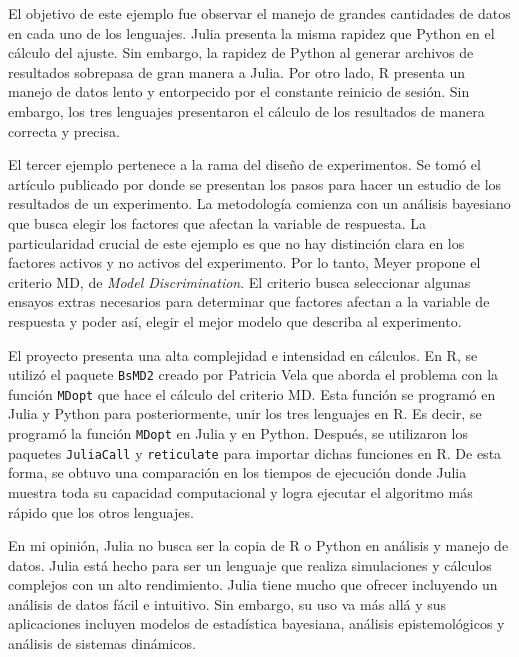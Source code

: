El objetivo de este ejemplo fue observar el manejo de grandes cantidades de datos en cada uno de los lenguajes. \textsf{Julia} presenta la misma rapidez que \textsf{Python} en el cálculo del ajuste. Sin embargo, la rapidez de \textsf{Python} al generar archivos de resultados sobrepasa de gran manera a \textsf{Julia}. Por otro lado, \textsf{R} presenta un manejo de datos lento y entorpecido por el constante reinicio de sesión. Sin embargo, los tres lenguajes presentaron el cálculo de los resultados de manera correcta y precisa. 

El tercer ejemplo pertenece a la rama del diseño de experimentos. Se tomó el artículo publicado por \cite{meyer1996} donde se presentan los pasos para hacer un estudio de los resultados de un experimento. La metodología comienza con un análisis bayesiano que busca elegir los factores que afectan la variable de respuesta. La particularidad crucial de este ejemplo es que no hay distinción clara en los factores activos y no activos del experimento. Por lo tanto, Meyer propone el criterio MD, de \textit{Model Discrimination}. El criterio busca seleccionar algunas ensayos extras necesarios para determinar que factores afectan a la variable de respuesta y poder así, elegir el mejor modelo que describa al experimento. 

El proyecto presenta una alta complejidad e intensidad en cálculos. En \textsf{R}, se utilizó el paquete \texttt{BsMD2} creado por Patricia Vela que aborda el problema con la función \texttt{MDopt} que hace el cálculo del criterio MD. Esta función se programó en \textsf{Julia} y \textsf{Python} para posteriormente, unir los tres lenguajes en \textsf{R}. Es decir, se programó la función \texttt{MDopt} en \textsf{Julia} y en \textsf{Python}. Después, se utilizaron los paquetes \texttt{JuliaCall} y \texttt{reticulate} para importar dichas funciones en \textsf{R}. De esta forma, se obtuvo una comparación en los tiempos de ejecución donde \textsf{Julia} muestra toda su capacidad computacional y logra ejecutar el algoritmo más rápido que los otros lenguajes. 

En mi opinión, \textsf{Julia} no busca ser la copia de \textsf{R} o \textsf{Python} en análisis y manejo de datos. \textsf{Julia} está hecho para ser un lenguaje que realiza simulaciones y cálculos complejos con un alto rendimiento. \textsf{Julia} tiene mucho que ofrecer incluyendo un análisis de datos fácil e intuitivo. Sin embargo, su uso va más allá y sus aplicaciones incluyen modelos de estadística bayesiana, análisis epistemológicos y análisis de sistemas dinámicos. 

